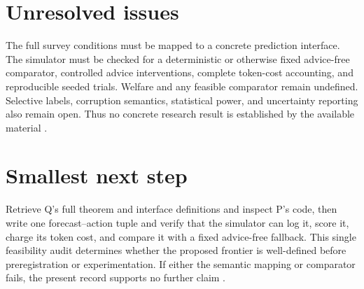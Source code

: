 \documentclass{article}
\begin{document}
\section{Unresolved issues}

The full survey conditions must be mapped to a concrete prediction interface.  The simulator must be checked for a deterministic or otherwise fixed advice-free comparator, controlled advice interventions, complete token-cost accounting, and reproducible seeded trials.  Welfare and any feasible comparator remain undefined.  Selective labels, corruption semantics, statistical power, and uncertainty reporting also remain open.  Thus no concrete research result is established by the available material .

\section{Smallest next step}

Retrieve Q's full theorem and interface definitions and inspect P's code, then write one forecast--action tuple and verify that the simulator can log it, score it, charge its token cost, and compare it with a fixed advice-free fallback.  This single feasibility audit determines whether the proposed frontier is well-defined before preregistration or experimentation.  If either the semantic mapping or comparator fails, the present record supports no further claim .
\end{document}
